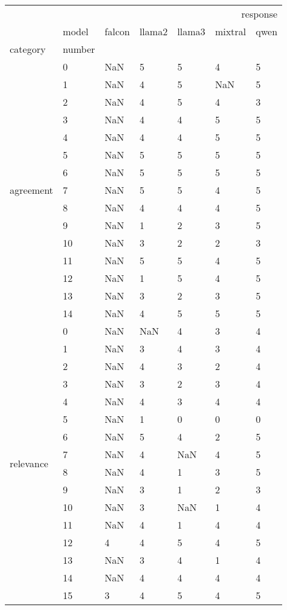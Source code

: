 \begin{tabular}{lllllll}
\toprule
 &  & \multicolumn{5}{r}{response} \\
 & model & falcon & llama2 & llama3 & mixtral & qwen \\
category & number &  &  &  &  &  \\
\midrule
\multirow[t]{15}{*}{agreement} & 0 & NaN & 5 & 5 & 4 & 5 \\
 & 1 & NaN & 4 & 5 & NaN & 5 \\
 & 2 & NaN & 4 & 5 & 4 & 3 \\
 & 3 & NaN & 4 & 4 & 5 & 5 \\
 & 4 & NaN & 4 & 4 & 5 & 5 \\
 & 5 & NaN & 5 & 5 & 5 & 5 \\
 & 6 & NaN & 5 & 5 & 5 & 5 \\
 & 7 & NaN & 5 & 5 & 4 & 5 \\
 & 8 & NaN & 4 & 4 & 4 & 5 \\
 & 9 & NaN & 1 & 2 & 3 & 5 \\
 & 10 & NaN & 3 & 2 & 2 & 3 \\
 & 11 & NaN & 5 & 5 & 4 & 5 \\
 & 12 & NaN & 1 & 5 & 4 & 5 \\
 & 13 & NaN & 3 & 2 & 3 & 5 \\
 & 14 & NaN & 4 & 5 & 5 & 5 \\
\cline{1-7}
\multirow[t]{16}{*}{relevance} & 0 & NaN & NaN & 4 & 3 & 4 \\
 & 1 & NaN & 3 & 4 & 3 & 4 \\
 & 2 & NaN & 4 & 3 & 2 & 4 \\
 & 3 & NaN & 3 & 2 & 3 & 4 \\
 & 4 & NaN & 4 & 3 & 4 & 4 \\
 & 5 & NaN & 1 & 0 & 0 & 0 \\
 & 6 & NaN & 5 & 4 & 2 & 5 \\
 & 7 & NaN & 4 & NaN & 4 & 5 \\
 & 8 & NaN & 4 & 1 & 3 & 5 \\
 & 9 & NaN & 3 & 1 & 2 & 3 \\
 & 10 & NaN & 3 & NaN & 1 & 4 \\
 & 11 & NaN & 4 & 1 & 4 & 4 \\
 & 12 & 4 & 4 & 5 & 4 & 5 \\
 & 13 & NaN & 3 & 4 & 1 & 4 \\
 & 14 & NaN & 4 & 4 & 4 & 4 \\
 & 15 & 3 & 4 & 5 & 4 & 5 \\
\cline{1-7}
\bottomrule
\end{tabular}
